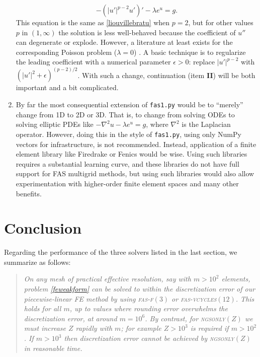 \documentclass[letterpaper,final,12pt,reqno]{amsart}
\newcommand{\eps}{\epsilon}
\newcommand{\grad}{\nabla}
\begin{document}
\begin{enumerate}
\begin{equation}
  -\left(|u'|^{p-2} u'\right)' - \lambda e^u = g.  \label{pbratu}
\end{equation}
This equation is the same as \eqref{liouvillebratu} when $p=2$, but for other values $p$ in $(1,\infty)$ the solution is less well-behaved because the coefficient of $u''$ can degenerate or explode.  However, a literature at least exists for the corresponding Poisson problem ($\lambda=0$) \cite{BarrettLiu1993,Bueler2021,Evans2007}.  A basic technique is to regularize the leading coefficient with a numerical parameter $\eps>0$: replace $|u'|^{p-2}$ with $\left(|u'|^2+\eps\right)^{(p-2)/2}$.  With such a change, continuation (item \textbf{II}) will be both important and a bit complicated.
\item By far the most consequential extension of \texttt{fas1.py} would be to ``merely'' change from 1D to 2D or 3D.  That is, to change from solving ODEs to solving elliptic PDEs like $-\grad^2 u - \lambda e^u=g$, where $\grad^2$ is the Laplacian operator.  However, doing this in the style of \texttt{fas1.py}, using only NumPy vectors for infrastructure, is not recommended.  Instead, application of a finite element library like Firedrake \cite{Bueler2021,Rathgeberetal2016} or Fenics \cite{Loggetal2012} would be wise.  Using such libraries requires a substantial learning curve, and these libraries do not have full support for FAS multigrid methods, but using such libraries would also allow experimentation with higher-order finite element spaces and many other benefits.
\end{enumerate}

\section{Conclusion}  \label{sec:conclusion}

Regarding the performance of the three solvers listed in the last section, we summarize as follows:

\begin{quotation}
\emph{On any mesh of practical effective resolution, say with $m>10^2$ elements, problem \eqref{feweakform} can be solved to within the discretization error of our piecewise-linear FE method by using \textsc{fas-f}$(3)$ or \textsc{fas-vcycles}$(12)$.  This holds for all $m$, up to values where rounding error overwhelms the discretization error, at around $m=10^6$.  By contrast, for \textsc{ngsonly}$(Z)$ we must increase $Z$ rapidly with $m$; for example $Z > 10^3$ is required if $m>10^2$.  If $m>10^3$ then discretization error cannot be achieved by \textsc{ngsonly}$(Z)$ in reasonable time.}
\end{quotation}
\end{document}
